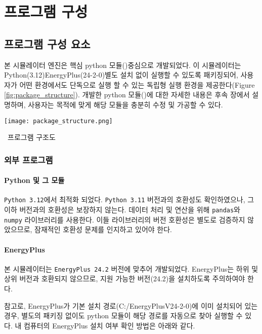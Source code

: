 \part{프로그램 구성}
\label{part:ioref}


\chapter{프로그램 구성 요소}
본 시뮬레이터 엔진은 핵심 python 모듈(\pymodule)\을 중심으로 개발되었다. 이 시뮬레이터는 Python(3.12)\cite{python312}\과 EnergyPlus(24-2-0)\cite{energyplus242}\를 별도 설치 없이 실행할 수 있도록 패키징되어, 사용자가 어떤 환경에서도 단독으로 실행 할 수 있는 독립형 실행 환경을 제공한다(Figure \ref{fig:package_structure}). 개발한 python 모듈(\pymodule)에 대한 자세한 내용은 후속 장에서 설명하며, 사용자는 목적에 맞게 해당 모듈을 충분히 수정 및 가공할 수 있다.

\begin{defaultfigure}
  \texttt{[image: package\_structure.png]}
  \caption{\simulator\ 프로그램 구조도}
  \label{fig:package_structure}
\end{defaultfigure}

\section{외부 프로그램}


\subsection{Python 및 그 모듈}
\texttt{Python 3.12}에서 최적화 되었다. \texttt{Python 3.11} 버전과의 호환성도 확인하였으나, 그 이하 버전과의 호환성은 보장하지 않는다.
데이터 처리 및 연산을 위해 \texttt{pandas}와 \texttt{numpy} 라이브러리를 사용한다. 이들 라이브러리의 버전 호환성은 별도로 검증하지 않았으므로, 잠재적인 호환성 문제를 인지하고 있어야 한다.

\subsection{EnergyPlus}
본 시뮬레이터는 \texttt{EnergyPlus 24.2} 버전에 맞추어 개발되었다. EnergyPlus는 하위 및 상위 버전과 호환되지 않으므로, 지원 가능한 버전(24.2)을 설치하도록 주의하여야 한다.\par
참고로, EnergyPlus가 기본 설치 경로(C:/EnergyPlusV24-2-0)에 이미 설치되어 있는 경우, 별도의 패키징 없이도 python 모듈이 해당 경로를 자동으로 찾아 실행할 수 있다. 내 컴퓨터의 EnergyPlus 설치 여부 확인 방법은 아래와 같다.

